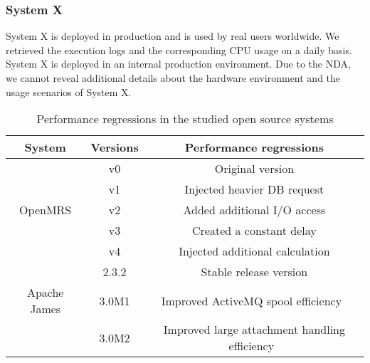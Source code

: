 \subsubsection{System X}
System X is deployed in production and is used by real users worldwide. We retrieved the execution logs and the corresponding CPU usage on a daily basis. System X is deployed in an internal production environment. Due to the NDA, we cannot reveal additional details about the hardware environment and the usage scenarios of System X.

\begin{table}[tbh]
  \centering
  \caption{Performance regressions in the studied open source systems}
    \begin{tabular}{c|c|p{3.3cm}}
    \hline
    System & Versions & \multicolumn{1}{c}{Performance regressions} \\
    \hline
          & v0    & \multicolumn{1}{c}{Original version} \\
\cline{2-3}          & v1    & \multicolumn{1}{c}{Injected heavier DB request} \\
\cline{2-3}    OpenMRS & v2    & \multicolumn{1}{c}{Added additional I/O access} \\
\cline{2-3}          & v3    & \multicolumn{1}{c}{Created a constant delay} \\
\cline{2-3}          & v4    & \multicolumn{1}{c}{Injected additional calculation} \\
    \hline
          & 2.3.2 & \multicolumn{1}{c}{Stable release version} \\
          \cline{2-3}
          Apache James & 3.0M1 & \multicolumn{1}{c}{Improved ActiveMQ spool efficiency~\citep{Apache-James}} \\
          \cline{2-3}
          & 3.0M2& \multicolumn{1}{c}{Improved large attachment handling efficiency~\citep{Apache-James}} \\
    \hline
    \end{tabular}%
  \label{tab:workloaddeisign}%
\end{table}%



